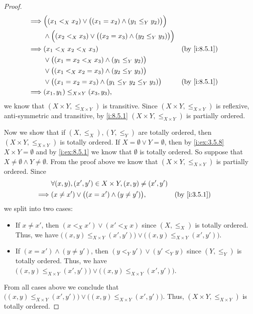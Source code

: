 \begin{proof}
\begin{align*}
    \implies & \Big((x_1 <_X x_2) \lor \big((x_1 = x_2) \land (y_1 \leq_Y y_2)\big)\Big)                                                   \\
             & \land \Big((x_2 <_X x_3) \lor \big((x_2 = x_3) \land (y_2 \leq_Y y_3)\big)\Big)                                             \\
    \implies & (x_1 <_X x_2 <_X x_3)                                                                                     &  & \by{i:8.5.1} \\
             & \lor \big((x_1 = x_2 <_X x_3) \land (y_1 \leq_Y y_2)\big)                                                                   \\
             & \lor \big((x_1 <_X x_2 = x_3) \land (y_2 \leq_Y y_3)\big)                                                                   \\
             & \lor \big((x_1 = x_2 = x_3) \land (y_1 \leq_Y y_2 \leq_Y y_3)\big)                                        &  & \by{i:8.5.1} \\
    \implies & (x_1, y_1) \leq_{X \times Y} (x_3, y_3),
  \end{align*}
  we know that \((X \times Y, \leq_{X \times Y})\) is transitive.
  Since \((X \times Y, \leq_{X \times Y})\) is reflexive, anti-symmetric and transitive, by \cref{i:8.5.1} \((X \times Y, \leq_{X \times Y})\) is partially ordered.

  Now we show that if \((X, \leq_X), (Y, \leq_Y)\) are totally ordered, then \((X \times Y, \leq_{X \times Y})\) is totally ordered.
  If \(X = \emptyset \lor Y = \emptyset\), then by \cref{i:ex:3.5.8} \(X \times Y = \emptyset\) and by \cref{i:ex:8.5.1} we know that \(\emptyset\) is totally ordered.
  So suppose that \(X \neq \emptyset \land Y \neq \emptyset\).
  From the proof above we know that \((X \times Y, \leq_{X \times Y})\) is partially ordered.
  Since
  \begin{align*}
             & \forall (x, y), (x', y') \in X \times Y, (x, y) \neq (x', y')                   \\
    \implies & (x \neq x') \lor \big((x = x') \land (y \neq y')\big),        &  & \by{i:3.5.1}
  \end{align*}
  we split into two cases:
  \begin{itemize}
    \item If \(x \neq x'\), then \((x <_X x') \lor (x' <_X x)\) since \((X, \leq_X)\) is totally ordered.
          Thus, we have \(\big((x, y) \leq_{X \times Y} (x', y')\big) \lor \big((x, y) \leq_{X \times Y} (x', y')\big)\).
    \item If \((x = x') \land (y \neq y')\), then \((y <_Y y') \lor (y' <_Y y)\) since \((Y, \leq_Y)\) is totally ordered.
          Thus, we have \(\big((x, y) \leq_{X \times Y} (x', y')\big) \lor \big((x, y) \leq_{X \times Y} (x', y')\big)\).
  \end{itemize}
  From all cases above we conclude that \(\big((x, y) \leq_{X \times Y} (x', y')\big) \lor \big((x, y) \leq_{X \times Y} (x', y')\big)\).
  Thus, \((X \times Y, \leq_{X \times Y})\) is totally ordered.


\end{proof}
